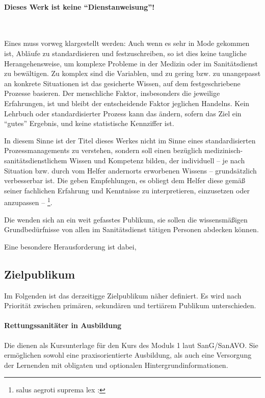 \documentclass[
ngerman,
paper=a4,
asymmetric,
fontsize=10pt,
draft=false,
numbers=noenddot,
bibtotocnumbered,
footnotes=multiple,
toc=flat,
]{scrbook}
\begin{document}
\paragraph{Dieses Werk ist keine "`Dienstanweisung"'!}~~

Eines muss vorweg klargestellt werden: Auch wenn es sehr in
Mode gekommen ist, Abläufe zu standardisieren und
festzuschreiben, so ist dies keine taugliche
Herangehensweise, um komplexe Probleme in der Medizin oder
im Sanitätsdienst zu bewältigen. Zu komplex sind die
Variablen, und zu gering bzw. zu unangepasst an konkrete
Situationen ist das gesicherte Wissen, auf dem
festgeschriebene Prozesse basieren. Der menschliche Faktor,
insbesonders die jeweilige Erfahrungen, ist und bleibt der
entscheidende Faktor jeglichen Handelns. Kein Lehrbuch oder
standardisierter Prozess kann das ändern, sofern das Ziel
ein "`gutes"' Ergebnis, und keine statistische Kennziffer
ist.

In diesem Sinne ist der Titel dieses Werkes nicht im Sinne eines
standardisierten Prozessmanagements zu verstehen, sondern soll einen
 bezüglich medizinisch-sanitätsdienstlichem Wissen und
Kompetenz bilden, der individuell -- je nach Situation bzw. durch vom Helfer
andernorts erworbenen Wissens -- grundsätzlich verbesserbar ist. Die {\AASS}
geben Empfehlungen, es obliegt dem Helfer diese gemäß seiner
fachlichen Erfahrung und Kenntnisse zu interpretieren, einzusetzen oder
anzupassen -- 
\footnote{salus aegroti suprema lex : }.
    
    


Die {\AASS} wenden sich an ein weit gefasstes Publikum, sie
sollen die wissensmäßigen Grundbedürfnisse  von allen im
Sanitätsdienst tätigen Personen abdecken können. 

Eine besondere Herausforderung ist dabei, 

\subsection{Zielpublikum}
Im Folgenden ist das derzeitigge Zielpublikum näher definiert. Es wird
nach Priorität zwischen primären, sekundären und tertiärem Publikum
unterschieden.


\paragraph{Rettungssanitäter in Ausbildung} 
Die \AASS{} dienen als Kursunterlage für den Kurs des Moduls 1 laut
SanG/SanAVO. Sie ermöglichen sowohl eine praxisorientierte Ausbildung, als auch
eine Versorgung der Lernenden mit obligaten und optionalen
Hintergrundinformationen.
\end{document}
